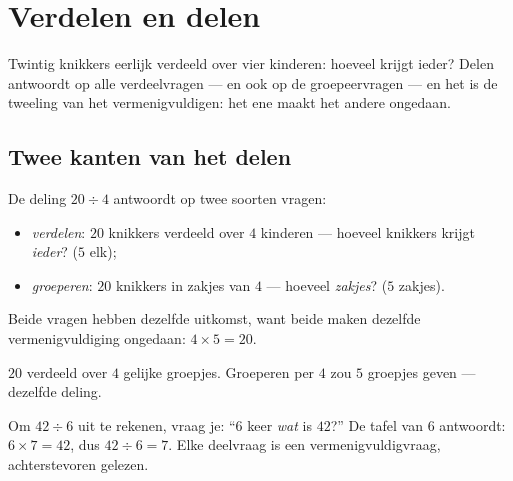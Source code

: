\chapter{Verdelen en delen}\label{ch:g3:division}

Twintig knikkers eerlijk verdeeld over vier kinderen: hoeveel krijgt
ieder? Delen antwoordt op alle verdeelvragen --- en ook op de
groepeervragen --- en het is de tweeling van het vermenigvuldigen: het
ene maakt het andere ongedaan.

\section{Twee kanten van het delen}

\begin{definition}[Delen]\label{def:g3:division:def}
De deling $20 \div 4$ antwoordt op twee soorten vragen:
\begin{itemize}
  \item \emph{verdelen}: $20$ knikkers verdeeld over $4$ kinderen ---
        hoeveel knikkers krijgt \emph{ieder}? ($5$ elk);
  \item \emph{groeperen}: $20$ knikkers in zakjes van $4$ --- hoeveel
        \emph{zakjes}? ($5$ zakjes).
\end{itemize}
Beide vragen hebben dezelfde uitkomst, want beide maken dezelfde
vermenigvuldiging ongedaan: $4 \times 5 = 20$.
\end{definition}

\begin{omfigure}

{\small $20$ verdeeld over $4$ gelijke groepjes. Groeperen per $4$ zou
$5$ groepjes geven --- dezelfde deling.}
\end{omfigure}

\begin{method}\label{met:g3:division:tables}
Om $42 \div 6$ uit te rekenen, vraag je: ``$6$ keer \emph{wat} is
$42$?'' De tafel van $6$ antwoordt: $6 \times 7 = 42$, dus
$42 \div 6 = 7$. Elke deelvraag is een vermenigvuldigvraag, achterstevoren
gelezen.
\end{method}

